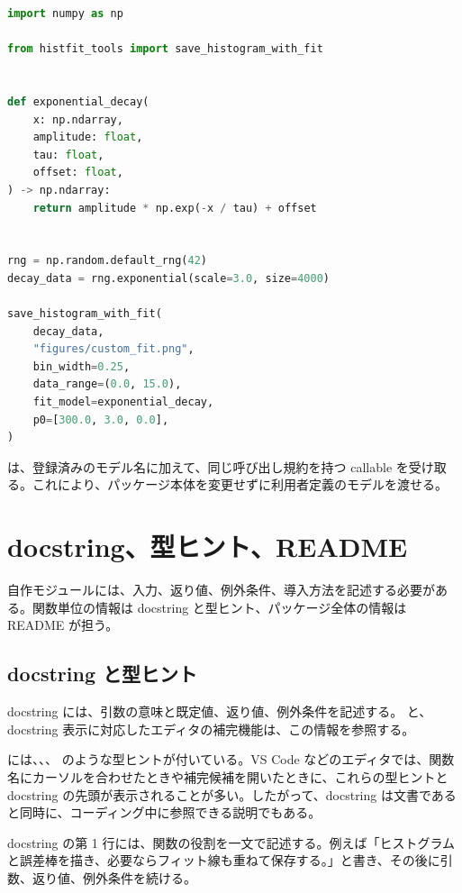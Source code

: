 \begin{lstlisting}[language=Python]
import numpy as np

from histfit_tools import save_histogram_with_fit


def exponential_decay(
    x: np.ndarray,
    amplitude: float,
    tau: float,
    offset: float,
) -> np.ndarray:
    return amplitude * np.exp(-x / tau) + offset


rng = np.random.default_rng(42)
decay_data = rng.exponential(scale=3.0, size=4000)

save_histogram_with_fit(
    decay_data,
    "figures/custom_fit.png",
    bin_width=0.25,
    data_range=(0.0, 15.0),
    fit_model=exponential_decay,
    p0=[300.0, 3.0, 0.0],
)
\end{lstlisting}

 は、登録済みのモデル名に加えて、同じ呼び出し規約を持つ callable を受け取る。これにより、パッケージ本体を変更せずに利用者定義のモデルを渡せる。

\section{docstring、型ヒント、README}

自作モジュールには、入力、返り値、例外条件、導入方法を記述する必要がある。関数単位の情報は docstring と型ヒント、パッケージ全体の情報は README が担う。

\subsection{docstring と型ヒント}

docstring には、引数の意味と既定値、返り値、例外条件を記述する。 と、docstring 表示に対応したエディタの補完機能は、この情報を参照する。

 には、、、 のような型ヒントが付いている。VS Code などのエディタでは、関数名にカーソルを合わせたときや補完候補を開いたときに、これらの型ヒントと docstring の先頭が表示されることが多い。したがって、docstring は文書であると同時に、コーディング中に参照できる説明でもある。

docstring の第 1 行には、関数の役割を一文で記述する。例えば「ヒストグラムと誤差棒を描き、必要ならフィット線も重ねて保存する。」と書き、その後に引数、返り値、例外条件を続ける。

